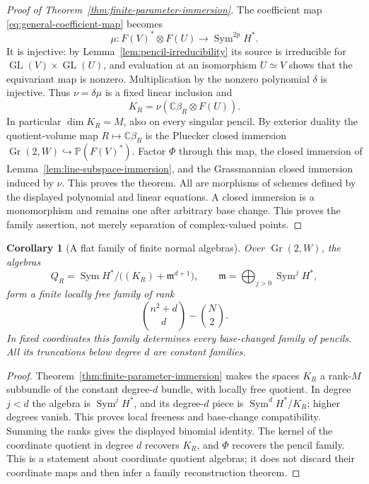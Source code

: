 \documentclass[11pt,reqno]{amsart}
\numberwithin{equation}{section}
\newtheorem{corollary}[theorem]{Corollary}
\theoremstyle{definition}\newtheorem{definition}[theorem]{Definition}
\theoremstyle{remark}\newtheorem{remark}[theorem]{Remark}
\newcommand{\C}{\mathbb C}\newcommand{\Q}{\mathbb Q}
\newcommand{\Pj}{\mathbb P}\newcommand{\A}{\mathbb A}
\DeclareMathOperator{\Sym}{Sym}\DeclareMathOperator{\Gr}{Gr}
\begin{document}
\begin{proof}[Proof of Theorem~\ref{thm:finite-parameter-immersion}]
The coefficient map \eqref{eq:general-coefficient-map} becomes
\[
 \mu:F(V)^*\otimes F(U)\longrightarrow\Sym^{2p}H^*.
\]
It is injective: by Lemma~\ref{lem:pencil-irreducibility} its
source is irreducible for \(\operatorname{GL}(V)\times
\operatorname{GL}(U)\), and evaluation at an isomorphism
\(U\simeq V\) shows that the equivariant map is nonzero.
Multiplication by the nonzero polynomial \(\delta\) is
injective.  Thus \(\nu=\delta\mu\) is a fixed linear
inclusion and
\begin{equation}\label{eq:finite-coefficient-factorization}
 K_R=\nu(\C\beta_R\otimes F(U)).
\end{equation}
In particular \(\dim K_R=M\), also on every singular pencil.
By exterior duality the quotient-volume map
\(R\mapsto\C\beta_R\) is the Pluecker closed immersion
\(\Gr(2,W)\hookrightarrow\Pj(F(V)^*)\).
Factor \(\Phi\) through this map, the closed immersion of
Lemma~\ref{lem:line-subspace-immersion}, and the Grassmannian
closed immersion induced by \(\nu\).  This proves the theorem.
All are morphisms of schemes defined by the displayed polynomial
and linear equations.  A closed immersion is a monomorphism and
remains one after arbitrary base change.  This proves the family
assertion, not merely separation of complex-valued points.
\end{proof}

\begin{corollary}[A flat family of finite normal algebras]
\label{cor:finite-flat-family}
Over \(\Gr(2,W)\), the algebras
\begin{equation}\label{eq:finite-flat-algebra}
 Q_R=\Sym H^*/\bigl((K_R)+\mathfrak m^{d+1}\bigr),
 \qquad \mathfrak m=\bigoplus_{j>0}\Sym^jH^*,
\end{equation}
form a finite locally free family of rank
\[
              \binom{n^2+d}{d}-\binom N2.
\]
In fixed coordinates this family determines every base-changed
family of pencils.  All its truncations below degree \(d\)
are constant families.
\end{corollary}
\begin{proof}
Theorem~\ref{thm:finite-parameter-immersion} makes the spaces
\(K_R\) a rank-\(M\) subbundle of the constant degree-\(d\)
bundle, with locally free quotient.  In degree \(j<d\) the
algebra is \(\Sym^jH^*\), and its degree-\(d\) piece is
\(\Sym^dH^*/K_R\); higher degrees vanish.  This proves
local freeness and base-change compatibility.  Summing the
ranks gives the displayed binomial identity.  The kernel of the
coordinate quotient in degree \(d\) recovers \(K_R\), and
\(\Phi\) recovers the pencil family.  This is a statement
about coordinate quotient algebras; it does not discard their
coordinate maps and then infer a family reconstruction theorem.
\end{proof}
\end{document}
